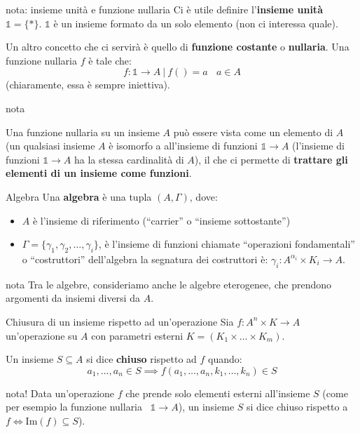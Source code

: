 \documentclass[a4paper,11pt]{report}
\begin{document}
\begin{gbox}{nota: insieme unità e funzione nullaria}
    Ci è utile definire l'\textbf{insieme unità} \( \mathbb{1} = \{*\} \). \( \mathbb{1} \) è un insieme formato da un solo elemento (non ci interessa quale). 

    Un altro concetto che ci servirà è quello di \textbf{funzione costante} o \textbf{nullaria}. Una funzione nullaria \( f \) è tale che:
    \[
        f: \mathbb{1} \to A \ | \ f() = a \ \ \ \ a\in A
    \]
    (chiaramente, essa è sempre iniettiva).

    \begin{gbox}{nota}

        Una funzione nullaria su un insieme \( A \) può essere vista come un elemento di \( A \) (un qualsiasi insieme \( A \) è isomorfo a all'insieme di funzioni \( \mathbb{1}\to A \) (l'insieme di funzioni \( \mathbb{1}\to A \) ha la stessa cardinalità di \( A \)), il che ci permette di \textbf{trattare gli elementi di un insieme come funzioni}.


    \end{gbox}
\end{gbox}

\begin{defbox}{Algebra}{}
    Una \textbf{algebra} è una tupla \( (A, \Gamma) \), dove:
    \begin{itemize}
        \item \( A \) è l'insieme di riferimento (``carrier'' o ``insieme sottostante'') 
        \item \( \Gamma = \{\gamma_1, \gamma_2, \dots, \gamma_i\} \), è l'insieme di funzioni chiamate ``operazioni fondamentali'' o ``costruttori'' dell'algebra
            \subitem la segnatura dei costruttori è: \( \gamma_i:A^{\alpha_i}\times K_i \to A \).

    \end{itemize}
    \begin{gbox}{nota}
        Tra le algebre, consideriamo anche le algebre eterogenee, che prendono argomenti da insiemi diversi da \( A \).
    \end{gbox}
\end{defbox}

\begin{defbox}{Chiusura di un insieme rispetto ad un'operazione}{}
    Sia \( f: A^n \times K \to A \) un'operazione su \( A \) con parametri esterni \( K = (K_1 \times \dots \times K_m) \). 

    Un insieme \( S \subseteq A \) si dice \textbf{chiuso} rispetto ad \( f \) quando:
    \[
        a_1, \dots, a_n \in S \implies f( a_1, \dots, a_n,  k_1, \dots, k_n) \in S
    \]

    \begin{gbox}[colframe=RedViolet, colbacktitle=RedViolet]{nota!}
        Data un'operazione \( f \) che prende solo elementi esterni all'insieme \( S \) (come per esempio la funzione nullaria \ \( \mathbb{1} \to A \)), un insieme \( S \) si dice chiuso rispetto a \(f \iff \text{Im}(f) \subseteq S \)).

    \end{gbox}
\end{defbox}
\end{document}
